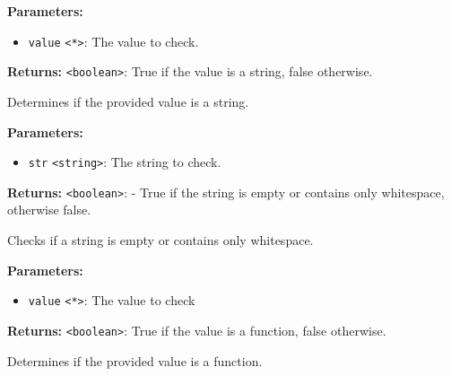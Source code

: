 \documentclass[12pt,a4paper]{article}
\begin{document}
\vspace{5mm}
\noindent {}


\noindent \textbf{Parameters:}
\begin{itemize}
  \item \texttt{value} \texttt{<*>}: The value to check.
\end{itemize}

\noindent \textbf{Returns:} \texttt{<boolean>}: True if the value is a string, false otherwise.

\noindent Determines if the provided value is a string.

\vspace{5mm}
\noindent {}


\noindent \textbf{Parameters:}
\begin{itemize}
  \item \texttt{str} \texttt{<string>}: The string to check.
\end{itemize}

\noindent \textbf{Returns:} \texttt{<boolean>}: - True if the string is empty or contains only whitespace, otherwise false.

\noindent Checks if a string is empty or contains only whitespace.

\vspace{5mm}
\noindent {}


\noindent \textbf{Parameters:}
\begin{itemize}
  \item \texttt{value} \texttt{<*>}: The value to check
\end{itemize}

\noindent \textbf{Returns:} \texttt{<boolean>}: True if the value is a function, false otherwise.

\noindent Determines if the provided value is a function.

\vspace{5mm}
\noindent {}
\end{document}
